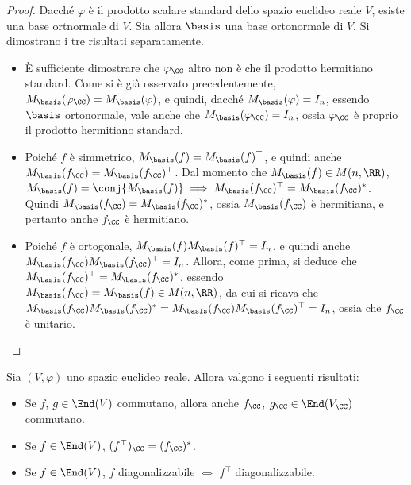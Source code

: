 \documentclass[11pt]{article}
\begin{document}
	\begin{proof}
		Dacché $\varphi$ è il prodotto scalare standard dello spazio euclideo reale $V$, esiste una base ortnormale di $V$. Sia allora $\basis$ una base ortonormale di $V$. Si dimostrano i tre risultati separatamente.
		
		\begin{itemize}
			\item È sufficiente dimostrare che $\varphi_\CC$ altro non è che il prodotto hermitiano standard.
			Come si è già osservato precedentemente, $M_\basis(\varphi_\CC) = M_\basis(\varphi)$, e quindi,
			dacché $M_\basis(\varphi) = I_n$, essendo $\basis$ ortonormale, vale anche che $M_\basis(\varphi_\CC) = I_n$,
			ossia $\varphi_\CC$ è proprio il prodotto hermitiano standard.
			
			\item Poiché $f$ è simmetrico, $M_\basis(f) = M_\basis(f)^\top$, e quindi anche
			$M_\basis(f_\CC) = M_\basis(f_\CC)^\top$. Dal momento che $M_\basis(f) \in M(n, \RR)$,
			$M_\basis(f) = \conj{M_\basis(f)} \implies M_\basis(f_\CC)^\top = M_\basis(f_\CC)^*$.
			Quindi $M_\basis(f_\CC) = M_\basis(f_\CC)^*$, ossia $M_\basis(f_\CC)$ è hermitiana,
			e pertanto anche $f_\CC$ è hermitiano.
			
			\item Poiché $f$ è ortogonale, $M_\basis(f) M_\basis(f)^\top = I_n$, e quindi
			anche $M_\basis(f_\CC) M_\basis(f_\CC)^\top = I_n$. Allora, come prima, si deduce
			che $M_\basis(f_\CC)^\top = M_\basis(f_\CC)^*$, essendo $M_\basis(f_\CC) = M_\basis(f) \in M(n, \RR)$,
			da cui
			si ricava che $M_\basis(f_\CC) M_\basis(f_\CC)^* = M_\basis(f_\CC) M_\basis(f_\CC)^\top = I_n$, ossia che $f_\CC$ è unitario. \\ \qedhere
		\end{itemize}
	\end{proof}

	\begin{exercise}
		Sia $(V, \varphi)$ uno spazio euclideo reale. Allora valgono i seguenti risultati:
		
		\begin{itemize}
			\item Se $f$, $g \in \End(V)$ commutano, allora anche $f_\CC$, $g_\CC \in \End(V_\CC)$ commutano.
			\item Se $f \in \End(V)$, $(f^\top)_\CC = (f_\CC)^*$.
			\item Se $f \in \End(V)$, $f$ diagonalizzabile $\iff$ $f^\top$ diagonalizzabile.
		\end{itemize}
	\end{exercise}
\end{document}
